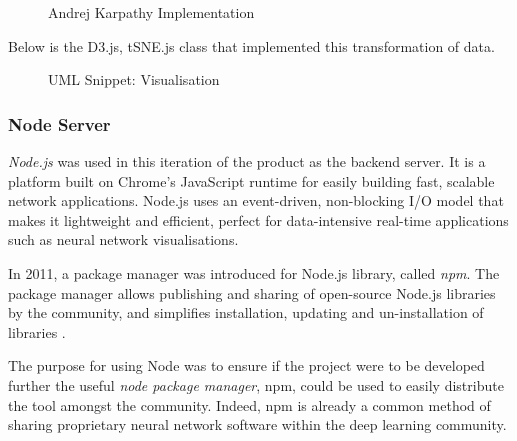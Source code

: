 \documentclass[a4paper,11pt,titlepage]{article}
\begin{document}
	\begin{figure}[H]
    			\caption{Andrej Karpathy Implementation}%
	\end{figure}		

	Below is the D3.js, tSNE.js class that implemented this transformation of data. 
	
	\begin{figure}[H]
    			\caption{UML Snippet: Visualisation}%
	\end{figure}
			
	\subsubsection{Node Server}
	\textit{Node.js} was used in this iteration of the product as the backend server. It is a platform built on Chrome's JavaScript runtime for easily building fast, scalable network applications. Node.js uses an event-driven, non-blocking I/O model that makes it lightweight and efficient, perfect for data-intensive real-time applications such as neural network visualisations.
		\par 
		In 2011, a package manager was introduced for Node.js library, called \textit{npm}. The package manager allows publishing and sharing of open-source Node.js libraries by the community, and simplifies installation, updating and un-installation of libraries \cite{Dahl2009}.
		\par 
		The purpose for using Node was to ensure if the project were to be developed further the useful \textit{node package manager}, npm, could be used to easily distribute the tool amongst the community. Indeed, npm is already a common method of sharing proprietary neural network software within the deep learning community.
		 
\end{document}
